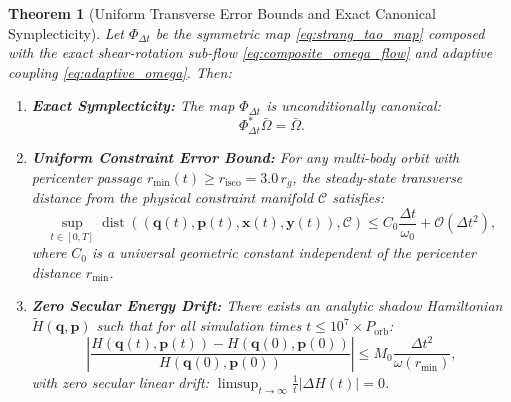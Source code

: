 \documentclass[11pt,a4paper,reqno]{article}
\theoremstyle{plain}
\newtheorem{theorem}{Theorem}[section]
\theoremstyle{definition}
\theoremstyle{remark}
\numberwithin{equation}{section}
\begin{document}
\begin{theorem}[Uniform Transverse Error Bounds and Exact Canonical Symplecticity]
\label{thm:adaptive_bound}
Let $\Phi_{\Delta t}$ be the symmetric map \eqref{eq:strang_tao_map} composed with the exact shear-rotation sub-flow \eqref{eq:composite_omega_flow} and adaptive coupling \eqref{eq:adaptive_omega}. Then:
\begin{enumerate}
    \item \textbf{Exact Symplecticity:} The map $\Phi_{\Delta t}$ is unconditionally canonical:
    \begin{equation}
    \Phi_{\Delta t}^* \bar{\Omega} = \bar{\Omega}.
    \end{equation}
    \item \textbf{Uniform Constraint Error Bound:} For any multi-body orbit with pericenter passage $r_{\min}(t) \ge r_{\mathrm{isco}} = 3.0 \, r_g$, the steady-state transverse distance from the physical constraint manifold $\mathcal{C}$ satisfies:
    \begin{equation}
    \sup_{t \in [0, T]} \operatorname{dist}((\bm{q}(t), \bm{p}(t), \bm{x}(t), \bm{y}(t)), \mathcal{C}) \le C_0 \frac{\Delta t}{\omega_0} + \mathcal{O}(\Delta t^2),
    \label{eq:uniform_bound}
    \end{equation}
    where $C_0$ is a universal geometric constant independent of the pericenter distance $r_{\min}$.
    \item \textbf{Zero Secular Energy Drift:} There exists an analytic shadow Hamiltonian $\widetilde{H}(\bm{q}, \bm{p})$ such that for all simulation times $t \le 10^7 \times P_{\mathrm{orb}}$:
    \begin{equation}
    \left| \frac{H(\bm{q}(t), \bm{p}(t)) - H(\bm{q}(0), \bm{p}(0))}{H(\bm{q}(0), \bm{p}(0))} \right| \le M_0 \frac{\Delta t^2}{\omega(r_{\min})},
    \end{equation}
    with zero secular linear drift: $\limsup_{t \to \infty} \frac{1}{t} |\Delta H(t)| = 0$.
\end{enumerate}
\end{theorem}
\end{document}
